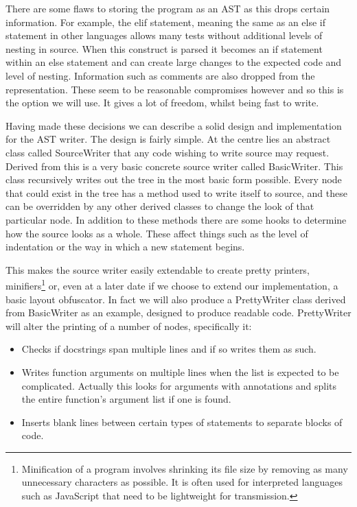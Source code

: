 \documentclass{report}
\begin{document}
There are some flaws to storing the program as an AST as this drops certain information.
For example, the elif statement, meaning the same as an else if statement in other languages allows many tests without additional levels of nesting in source.
When this construct is parsed it becomes an if statement within an else statement and can create large changes to the expected code and level of nesting. Information
such as comments are also dropped from the representation. These seem to be reasonable compromises however and so this is the option we will use. It gives
a lot of freedom, whilst being fast to write.

Having made these decisions we can describe a solid design and implementation for the AST writer. The design is fairly simple.
At the centre lies an abstract class called SourceWriter that any code wishing to write source may request. Derived from this
is a very basic concrete source writer called BasicWriter. This class recursively writes out the tree in the
most basic form possible. Every node that could exist in the tree has a method used to write itself to source, and these can be overridden by any
other derived classes to change the look of that particular node. In addition to these methods there are some hooks to determine how
the source looks as a whole. These affect things such as the level of indentation or the way in which a new statement begins.

This makes the source writer easily extendable to create pretty printers, minifiers\footnote{Minification of a program involves shrinking its file size by removing as many unnecessary characters as possible. It is often used for interpreted languages such as JavaScript that need to be lightweight for transmission.}
or, even at a later date if we choose to extend our implementation, a basic layout obfuscator. In fact we will also produce a PrettyWriter class derived from BasicWriter
as an example, designed to produce readable code. PrettyWriter will alter the printing of a number of nodes, specifically it:

\begin{itemize}
\item Checks if docstrings span multiple lines and if so writes them as such.
\item Writes function arguments on multiple lines when the list is expected to be complicated. Actually this looks for arguments with annotations and splits the entire function's argument list if one is found.
\item Inserts blank lines between certain types of statements to separate blocks of code.
\end{itemize}
\end{document}
